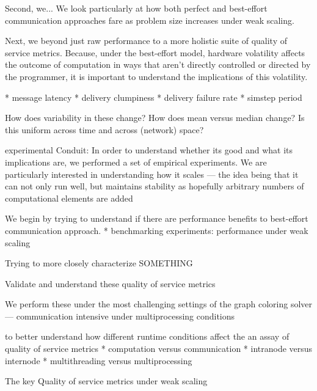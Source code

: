 Second, we...
We look particularly at how both perfect and best-effort communication approaches fare as problem size increases under weak scaling.

Next, we beyond just raw performance to a more holistic suite of quality of service metrics.
Because, under the best-effort model, hardware volatility affects the outcome of computation in ways that aren't directly controlled or directed by the programmer, it is important to understand the implications of this volatility.

* message latency
* delivery clumpiness
* delivery failure rate
* simstep period

How does variability in these change?
How does mean versus median change?
Is this uniform across time and across (network) space?

experimental
Conduit: In order to understand whether its good and what its implications are, we performed a set of empirical experiments.
We are particularly interested in understanding how it scales --- the idea being that it can not only run well, but maintains stability as hopefully arbitrary numbers of computational elements are added

We begin by trying to understand if there are performance benefits to best-effort communication approach.
* benchmarking experiments: performance under weak scaling

Trying to more closely characterize SOMETHING

Validate and understand these quality of service metrics

We perform these under the most challenging settings of the graph coloring solver --- communication intensive under multiprocessing conditions

to better understand how different runtime conditions affect the an assay of quality of service metrics
* computation versus communication
* intranode versus internode
* multithreading versus multiprocessing

The key
Quality of service metrics under weak scaling
